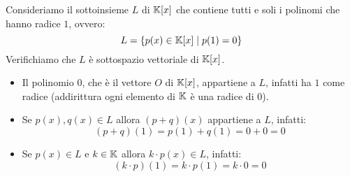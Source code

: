 \begin{example}
	Consideriamo il sottoinsieme $L$ di $\mathbb{K}[x]$ che contiene tutti e soli i polinomi che hanno radice
	$1$, ovvero:
	\[ L = \{p(x) \in \mathbb{K}[x] \mid p(1) = 0\} \]
	Verifichiamo che $L$ è sottospazio vettoriale di $\mathbb{K}[x]$.
	\begin{itemize}
		\item Il polinomio $0$, che è il vettore $O$ di $\mathbb{K}[x]$, appartiene a $L$, infatti ha $1$
		      come radice (addirittura ogni elemento di $\mathbb{K}$ è una radice di $0$).
		\item Se $p(x), q(x) \in L$ allora $(p + q)(x)$ appartiene a $L$, infatti:
		      \[ (p + q)(1) = p(1) + q(1) = 0 + 0 = 0 \]
		\item Se $p(x) \in L$ e $k \in \mathbb{K}$ allora $k \cdot p(x) \in L$, infatti:
		      \[ (k \cdot p)(1) = k \cdot p(1) = k \cdot 0 = 0 \]
	\end{itemize}
\end{example}
